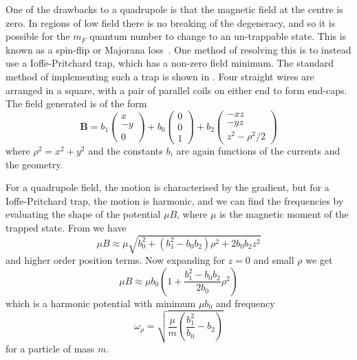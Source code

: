 One of the drawbacks to a quadrupole is that the magnetic field at the centre
is zero. In regions of low field there is no breaking of the degeneracy, and so
it is possible for the $m_F$ quantum number to change to an un-trappable state.
This is known as a spin-flip or Majorana loss~\cite{Brink2006}. One method of
resolving this is to instead use a Ioffe-Pritchard trap, which has a non-zero
field minimum. The standard method of implementing such a trap is shown in
. Four straight wires are arranged in a
square, with a pair of parallel coils on either end to form end-caps. The field
generated is of the form
%
\begin{equation}
  \mathbf{B} = b_1 \begin{pmatrix} x \\ -y \\ 0 \end{pmatrix}
  + b_0 \begin{pmatrix} 0 \\ 0 \\ 1 \end{pmatrix}
  + b_2 \begin{pmatrix} -xz \\ -yz \\ z^2 - \rho^2/2 \end{pmatrix}
  \label{theory:eqn:IP}
\end{equation}
%
where $\rho^2 = x^2 + y^2$ and the constants $b_i$ are again functions
of the currents and the geometry.

For a quadrupole field, the motion is characterised by the gradient, but for a
Ioffe-Pritchard trap, the motion is harmonic, and we can find the frequencies
by evaluating the shape of the potential $\mu B$, where $\mu$ is the magnetic
moment of the trapped state. From  we have
%
\begin{equation}
  \mu B \approx \mu \sqrt{b_0^2 + (b_1^2 -
  b_0b_2)\rho^2 + 2b_0b_2z^2}
\end{equation}
%
and higher order position terms. Now expanding for $z=0$ and small $\rho$ we get
%
\begin{equation}
  \mu B \approx \mu b_0\left(1 + \frac{b_1^2 -
    b_0b_2}{2b_0}\rho^2\right)
\end{equation}
%
which is a harmonic potential with minimum $\mu b_0$ and frequency
%
\begin{equation}
  \omega_\rho = \sqrt{\frac{\mu}{m}\left(\frac{b_1^2}{b_0}-b_2\right)}
\end{equation}
%
for a particle of mass $m$.

